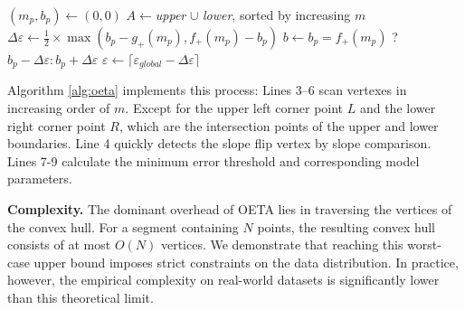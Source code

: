 \begin{algorithm}[t]
  \caption{OETA}
  \label{alg:oeta}
  \small 
  $(m_p, b_p) \gets (0, 0)$\;
  $A \gets $\textit{upper} $\cup$ \textit{lower}, sorted by increasing $m$\;
  $\varDelta\varepsilon \gets \frac{1}{2} \times\max(b_p - g_+(m_p), f_+(m_p) - b_p)$\; 
  $b \gets b_p = f_+(m_p) $ ? $b_p - \varDelta\varepsilon : b_p + \varDelta\varepsilon$\;
  $\varepsilon \gets \lceil \varepsilon_{global} - \varDelta\varepsilon \rceil $\;
\end{algorithm}

Algorithm \ref{alg:oeta} implements this process: Lines 3–6 scan vertexes in increasing order of $m$. Except for the upper left corner point $L$ and the lower right corner point $R$, which are the intersection points of the upper and lower boundaries. Line 4 quickly detects the slope flip vertex by slope comparison. Lines 7-9 calculate the minimum error threshold and corresponding model parameters.

\textbf{Complexity.} The dominant overhead of OETA lies in traversing the vertices of the convex hull. For a segment containing $N$ points, the resulting convex hull consists of at most $O(N)$ vertices. We demonstrate that reaching this worst-case upper bound imposes strict constraints on the data distribution. In practice, however, the empirical complexity on real-world datasets is significantly lower than this theoretical limit.

